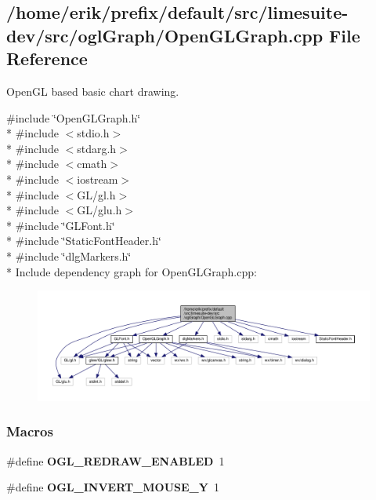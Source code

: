 \subsection{/home/erik/prefix/default/src/limesuite-\/dev/src/ogl\+Graph/\+Open\+G\+L\+Graph.cpp File Reference}
\label{OpenGLGraph_8cpp}


Open\+GL based basic chart drawing.  


{\ttfamily \#include \char`\"{}Open\+G\+L\+Graph.\+h\char`\"{}}\\*
{\ttfamily \#include $<$stdio.\+h$>$}\\*
{\ttfamily \#include $<$stdarg.\+h$>$}\\*
{\ttfamily \#include $<$cmath$>$}\\*
{\ttfamily \#include $<$iostream$>$}\\*
{\ttfamily \#include $<$G\+L/gl.\+h$>$}\\*
{\ttfamily \#include $<$G\+L/glu.\+h$>$}\\*
{\ttfamily \#include \char`\"{}G\+L\+Font.\+h\char`\"{}}\\*
{\ttfamily \#include \char`\"{}Static\+Font\+Header.\+h\char`\"{}}\\*
{\ttfamily \#include \char`\"{}dlg\+Markers.\+h\char`\"{}}\\*
Include dependency graph for Open\+G\+L\+Graph.\+cpp\+:
\nopagebreak
\begin{figure}[H]
\begin{center}
\leavevmode
\includegraphics[width=350pt]{d5/da9/OpenGLGraph_8cpp__incl}
\end{center}
\end{figure}
\subsubsection*{Macros}
\begin{DoxyCompactItemize}
\item 
\#define {\bf O\+G\+L\+\_\+\+R\+E\+D\+R\+A\+W\+\_\+\+E\+N\+A\+B\+L\+ED}~1
\item 
\#define {\bf O\+G\+L\+\_\+\+I\+N\+V\+E\+R\+T\+\_\+\+M\+O\+U\+S\+E\+\_\+Y}~1
\end{DoxyCompactItemize}
